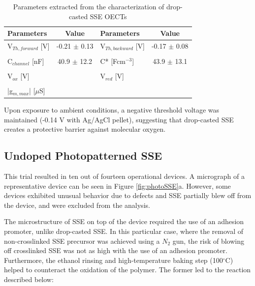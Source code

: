 \begin{table}[ht]
\centering
\caption{Parameters extracted from the characterization of drop-casted SSE OECTs}
\begin{tabular}{l|c||l|c}
Parameters & Value & Parameters & Value \\\hline \hline
V$_{Th,forward}$ [V] & -0.21 $\pm$ 0.13 & V$_{Th,backward}$ [V] & -0.17 $\pm$ 0.08\\
& & &\\[-1em]
C$_{channel}$ [nF] & 40.9 $\pm$ 12.2 & C* [Fcm$^{-3}$] &  43.9 $\pm$ 13.1 \\
& & &\\[-1em]
V$_{ox}$ [V] &  & V$_{red}$ [V] &  \\
& & &\\[-1em]
|g$_{m,max}$| [$\mu$S] &  &  &\\\hline
\end{tabular}
\label{tab:dropfom}
\end{table}

Upon exposure to ambient conditions, a negative threshold voltage was maintained (-0.14 V with Ag/AgCl pellet), suggesting that drop-casted SSE creates a protective barrier against molecular oxygen.%

\subsection{Undoped Photopatterned SSE} %
This trial resulted in ten out of fourteen operational devices. A micrograph of a representative device can be seen in Figure \ref{fig:photoSSE}a. However, some devices exhibited unusual behavior due to defects and SSE partially blew off from the device, and were excluded from the analysis.

The microstructure of SSE on top of the device required the use of an adhesion promoter, unlike drop-casted SSE. In this particular case, where the removal of non-crosslinked SSE precursor was achieved using a $N_{2}$ gun, the risk of blowing off crosslinked SSE was not as high with the use of an adhesion promoter. %
Furthermore, the ethanol rinsing and high-temperature baking step (100$^{\circ}$C) helped to counteract the oxidation of the polymer. The former led to the reaction described below: \\

